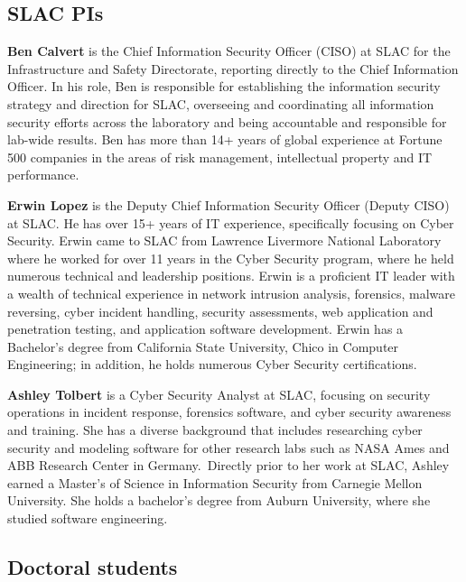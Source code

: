 \documentclass[11pt]{article}
\newcommand{\slim}{\vspace{\baselineskip}}
\begin{document}
\subsection{SLAC PIs}

\noindent \textbf{Ben Calvert} is the Chief Information Security
Officer (CISO) at SLAC for the Infrastructure and Safety Directorate,
reporting directly to the Chief Information Officer. In his role, Ben
is responsible for establishing the information security strategy and
direction for SLAC, overseeing and coordinating all information
security efforts across the laboratory and being accountable and
responsible for lab-wide results. Ben has more than 14+ years of
global experience at Fortune 500 companies in the areas of risk
management, intellectual property and IT performance.

\slim

\noindent \textbf{Erwin Lopez} is the Deputy Chief Information
Security Officer (Deputy CISO) at SLAC. He has over 15+ years of IT
experience, specifically focusing on Cyber Security. Erwin came to
SLAC from Lawrence Livermore National Laboratory where he worked for
over 11 years in the Cyber Security program, where he held numerous
technical and leadership positions. Erwin is a proficient IT leader
with a wealth of technical experience in network intrusion analysis,
forensics, malware reversing, cyber incident handling, security
assessments, web application and penetration testing, and application
software development. Erwin has a Bachelor's degree from California
State University, Chico in Computer Engineering; in addition, he holds
numerous Cyber Security certifications.

\slim

\noindent \textbf{Ashley Tolbert} is a Cyber Security Analyst at SLAC,
focusing on security operations in incident response, forensics
software, and cyber security awareness and training. She has a diverse
background that includes researching cyber security and modeling
software for other research labs such as NASA Ames and ABB Research
Center in Germany. Directly prior to her work at SLAC, Ashley earned a
Master's of Science in Information Security from Carnegie Mellon
University. She holds a bachelor’s degree from Auburn University,
where she studied software engineering.  \slim

\subsection{Doctoral students}
\end{document}
